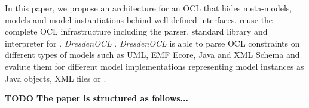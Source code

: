 In this paper, we propose an architecture for an OCL
 that hides meta-models,
models and model instantiations behind well-defined interfaces.  reuse
 the complete OCL infrastructure including the parser, standard library
and interpreter for .  \textit{DresdenOCL}
\cite{WWW:dresdenOCL}. \textit{DresdenOCL} is able to parse OCL
constraints on different types of models such as UML, EMF Ecore, Java and XML Schema 
and evalute them for different model implementations representing model
instances as Java objects, XML files or .

\textbf{TODO The paper is structured as follows...}